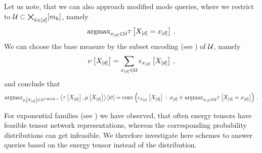 Let us note, that we can also approach modified mode queries, where we restrict to $\mathcal{U}\subset\bigtimes_{k\in[d]}[m_{k}]$, namely
\begin{align*}
    \mathrm{argmax}_{x_{[d]}\in\mathcal{U}} \tau\left[X_{[d]}=x_{[d]}\right] \, .
\end{align*}
We can choose the base measure by the subset encoding (see ) of $\mathcal{U}$, namely
\begin{align*}
    \nu\left[X_{[d]}\right] = \sum_{x_{[d]}\in\mathcal{U}} \epsilon_{x_{[d]}}\left[X_{[d]}\right] \, ,
\end{align*}
and conclude that
\begin{align*}
    \mathrm{argmax}_{\mu\left[X_{[d]}\right]\in\Lambda^{\delta,\mathrm{MAX},\nu}} \left\langle \tau\left[X_{[d]}\right],\mu\left[X_{[d]}\right]\right\rangle \left[ \varnothing \right]
    = \mathrm{conv}\left(\epsilon_{x_{[d]}}\left[X_{[d]}\right] \,:\, x_{[d]}\in\mathrm{argmax}_{x_{[d]}\in\mathcal{U}} \tau\left[X_{[d]}=x_{[d]}\right]\right) \, .
\end{align*}




For exponential families (see ) we have observed, that often energy tensors have feasible tensor network representations, whereas the corresponding probability distributions can get infeasible.
We therefore investigate here schemes to answer queries based on the energy tensor instead of the distribution.

